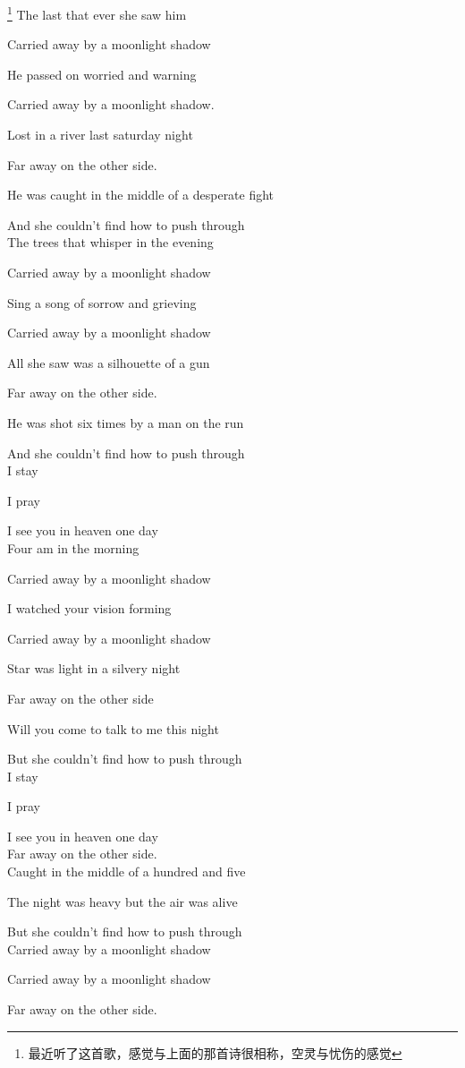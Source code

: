 {\footnote{最近听了这首歌，感觉与上面的那首诗很相称，空灵与忧伤的感觉}
The last that ever she saw him

Carried away by a moonlight shadow

He passed on worried and warning

Carried away by a moonlight shadow.

Lost in a river last saturday night

Far away on the other side.

He was caught in the middle of a desperate fight

And she couldn't find how to push through\\


The trees that whisper in the evening

Carried away by a moonlight shadow

Sing a song of sorrow and grieving

Carried away by a moonlight shadow

All she saw was a silhouette of a gun

Far away on the other side.

He was shot six times by a man on the run

And she couldn't find how to push through\\

I stay

I pray

I see you in heaven one day\\

Four am in the morning

Carried away by a moonlight shadow

I watched your vision forming

Carried away by a moonlight shadow

Star was light in a silvery night

Far away on the other side

Will you come to talk to me this night

But she couldn't find how to push through\\


I stay

I pray

I see you in heaven one day\\

Far away on the other side.\\


Caught in the middle of a hundred and five

The night was heavy but the air was alive

But she couldn't find how to push through\\

Carried away by a moonlight shadow

Carried away by a moonlight shadow

Far away on the other side. \\

}
